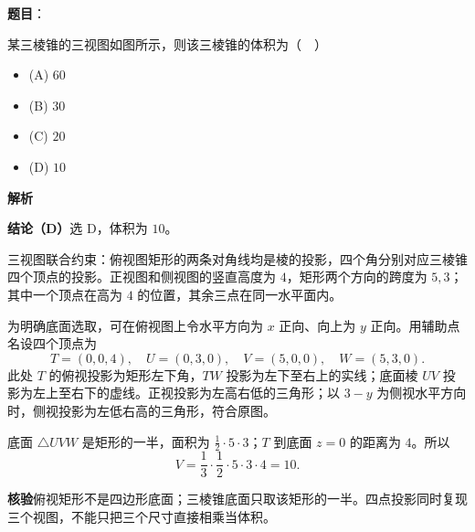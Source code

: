 \begin{answer}

\textbf{题目}：

某三棱锥的三视图如图所示，则该三棱锥的体积为（　）
\nopagebreak[4]
\begin{center}\end{center}
\nopagebreak[4]
\begin{itemize}
\item (A) $60$
\item (B) $30$
\item (C) $20$
\item (D) $10$
\end{itemize}

\textbf{解析}

\textbf{结论（D）}选 D，体积为 $10$。

三视图联合约束：俯视图矩形的两条对角线均是棱的投影，四个角分别对应三棱锥四个顶点的投影。正视图和侧视图的竖直高度为 $4$，矩形两个方向的跨度为 $5,3$；其中一个顶点在高为 $4$ 的位置，其余三点在同一水平面内。

为明确底面选取，可在俯视图上令水平方向为 $x$ 正向、向上为 $y$ 正向。用辅助点名设四个顶点为
\nopagebreak[4]
\[
T=(0,0,4),\quad U=(0,3,0),\quad V=(5,0,0),\quad W=(5,3,0).
\]
此处 $T$ 的俯视投影为矩形左下角，$TW$ 投影为左下至右上的实线；底面棱 $UV$ 投影为左上至右下的虚线。正视投影为左高右低的三角形；以 $3-y$ 为侧视水平方向时，侧视投影为左低右高的三角形，符合原图。

底面 $\triangle UVW$ 是矩形的一半，面积为 $\frac12\cdot5\cdot3$；$T$ 到底面 $z=0$ 的距离为 $4$。所以
\nopagebreak[4]
\[
V=\frac13\cdot\frac12\cdot5\cdot3\cdot4=10.
\]

\textbf{核验}俯视矩形不是四边形底面；三棱锥底面只取该矩形的一半。四点投影同时复现三个视图，不能只把三个尺寸直接相乘当体积。


\end{answer}
